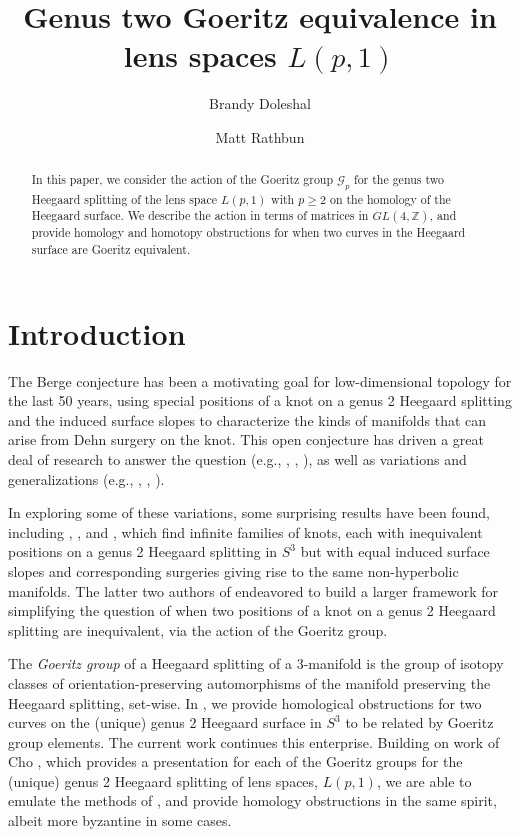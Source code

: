 \documentclass{amsart}     %
\title{Genus two Goeritz equivalence in lens spaces $L(p, 1)$}
\author{Brandy Doleshal}
\author{Matt Rathbun}
\theoremstyle{definition}
\begin{document}
\maketitle

\begin{abstract}
In this paper, we consider the action of the Goeritz group $\mathcal G_p$ for the genus two Heegaard splitting of the lens space $L(p,1)$ with $p\ge 2$ on the homology of the Heegaard surface. We describe the action in terms of matrices in $GL(4, \mathbb Z)$, and provide homology and homotopy obstructions for when two curves in the Heegaard surface are  Goeritz equivalent. 
\end{abstract}

\section{Introduction}

The Berge conjecture has been a motivating goal for low-dimensional topology for the last 50 years, using special positions of a knot on a genus 2 Heegaard splitting and the induced surface slopes to characterize the kinds of manifolds that can arise from Dehn surgery on the knot. This open conjecture has driven a great deal of research to answer the question (e.g., \cite{GreLSRP}, \cite{HedFHBCKALSS}, \cite{NiKFHDFK}), as well as variations and generalizations (e.g., \cite{BakHofLicJPKSBLS}, \cite{DeaSSFDSHK}, \cite{LiuLSSL}).

In exploring some of these variations, some surprising results have been found, including \cite{AmoDolRatACPTTK}, \cite{EudOHKSFDS}, and \cite{GunKDPPPSR}, which find infinite families of knots, each with inequivalent positions on a genus 2 Heegaard splitting in $S^3$ but with equal induced surface slopes and corresponding surgeries giving rise to the same non-hyperbolic manifolds. The latter two authors of \cite{AmoDolRatACPTTK} endeavored to build a larger framework for simplifying the question of when two positions of a knot on a genus 2 Heegaard splitting are inequivalent, via the action of the Goeritz group. 

The \textit{Goeritz group} of a Heegaard splitting of a $3$-manifold is the group of isotopy classes of orientation-preserving automorphisms of the manifold preserving the Heegaard splitting, set-wise. In \cite{DolRatG2GES3}, we provide homological obstructions for two curves on the (unique) genus 2 Heegaard surface in $S^3$ to be related by Goeritz group elements. The current work continues this enterprise. Building on work of Cho \cite{ChoG2GGLS}, which provides a presentation for each of the Goeritz groups for the (unique) genus 2 Heegaard splitting of lens spaces, $L(p, 1)$, we are able to emulate the methods of \cite{DolRatG2GES3}, and provide homology obstructions in the same spirit, albeit more byzantine in some cases.
\end{document}
